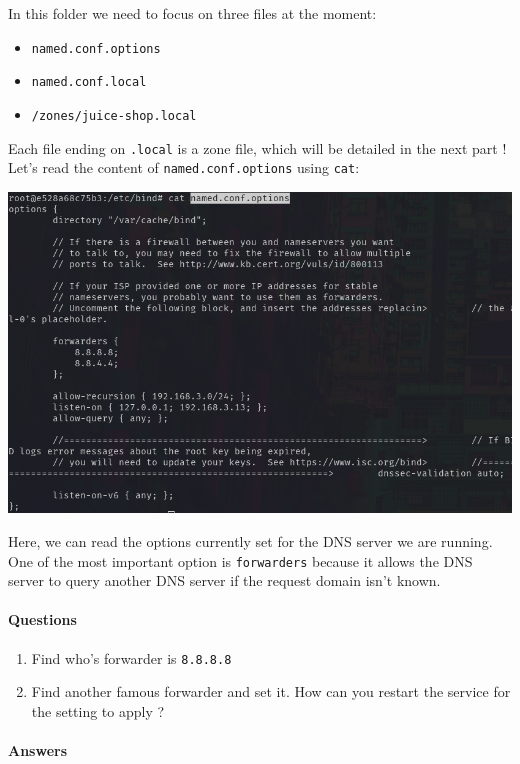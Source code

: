 \documentclass[a4paper,11pt,singlespacing]{article}
\providecommand{\tightlist}{%
  \setlength{\itemsep}{0pt}\setlength{\parskip}{0pt}}
\begin{document}
In this folder we need to focus on three files at the moment:

\begin{itemize}
\tightlist
\item
  \texttt{named.conf.options}
\item
  \texttt{named.conf.local}
\item
  \texttt{/zones/juice-shop.local}
\end{itemize}

Each file ending on \texttt{.local} is a zone file, which will be
detailed in the next part ! Let's read the content of
\texttt{named.conf.options} using \texttt{cat}:

\includegraphics{Images/Image10.png}

Here, we can read the options currently set for the DNS server we are
running. One of the most important option is \texttt{forwarders} because
it allows the DNS server to query another DNS server if the request
domain isn't known.

\paragraph{Questions}\label{questions-2}

\begin{enumerate}
\def\labelenumi{\arabic{enumi}.}
\tightlist
\item
  Find who's forwarder is \texttt{8.8.8.8}
\item
  Find another famous forwarder and set it. How can you restart the
  service for the setting to apply ?
\end{enumerate}

\newpage

\paragraph{Answers}\label{answers-3}
\end{document}
